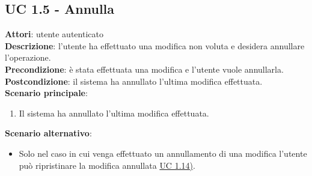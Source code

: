 \subsection{UC 1.5 - Annulla}{
	\label{uc1.5}
	\textbf{Attori}: utente autenticato \\
	\textbf{Descrizione}: l'utente ha effettuato una modifica non voluta e desidera annullare l'operazione. \\
	\textbf{Precondizione}: è stata effettuata una modifica e l'utente vuole annullarla.	\\
	\textbf{Postcondizione}: il sistema ha annullato l'ultima modifica effettuata.	\\
	\textbf{Scenario principale}:
	\begin{enumerate}
		\item Il sistema ha annullato l'ultima modifica effettuata.
	\end{enumerate}				
	\textbf{Scenario alternativo}: 
	\begin{itemize}
		\item Solo nel caso in cui venga effettuato un annullamento di una modifica l'utente può ripristinare la modifica annullata \hyperref[uc1.14]{UC 1.14)}.
	\end{itemize}
	}
